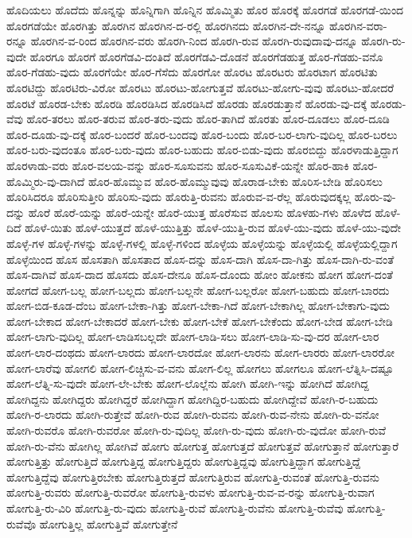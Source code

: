 {ಹೊದಿಯಲು
ಹೊದೆದು
ಹೊನ್ನನ್ನು
ಹೊನ್ನಿಗಾಗಿ
ಹೊನ್ನಿನ
ಹೊಮ್ಮಿತು
ಹೊರ
ಹೊರಕ್ಕೆ
ಹೊರಗಡೆ
ಹೊರಗಡೆ-ಯಿಂದ
ಹೊರಗಡೆಯೇ
ಹೊರಗಿತ್ತು
ಹೊರಗಿನ
ಹೊರಗಿನ-ದ-ರಲ್ಲಿ
ಹೊರಗಿನದು
ಹೊರಗಿನ-ದೇ-ನನ್ನೂ
ಹೊರಗಿನ-ವರಾ-ರನ್ನೂ
ಹೊರಗಿನ-ವ-ರಿಂದ
ಹೊರಗಿನ-ವರು
ಹೊರಗಿ-ನಿಂದ
ಹೊರಗಿ-ರುವ
ಹೊರಗಿ-ರುವುದಾವು-ದನ್ನೂ
ಹೊರಗಿ-ರು-ವುದೇ
ಹೊರಗೂ
ಹೊರಗೆ
ಹೊರಗೆಡವಿ-ದಂತಿದೆ
ಹೊರಗೆಡವಿ-ದೊಡನೆ
ಹೊರಗೆಡಹುತ್ತ
ಹೊರ-ಗೆಡಹು-ವನೊ
ಹೊರ-ಗೆಡಹು-ವುದು
ಹೊರಗೆಯೇ
ಹೊರ-ಗೆಸೆದು
ಹೊರಗೋ
ಹೊರಟ
ಹೊರಟರು
ಹೊರಟಾಗ
ಹೊರಟಿತು
ಹೊರಟಿದ್ದು
ಹೊರಟಿರು-ವಿರೋ
ಹೊರಟು
ಹೊರಟು-ಹೋಗುತ್ತವೆ
ಹೊರಟು-ಹೋಗು-ವುವು
ಹೊರಟು-ಹೋದರೆ
ಹೊರಟೆ
ಹೊರಡ-ಬೇಕು
ಹೊರಡಿ
ಹೊರಡಿಸಿದ
ಹೊರಡಿಸಿದೆ
ಹೊರಡು
ಹೊರಡುತ್ತಾನೆ
ಹೊರಡು-ವು-ದಕ್ಕೆ
ಹೊರಡು-ವೆವು
ಹೊರ-ತರಲು
ಹೊರ-ತರುವ
ಹೊರ-ತರು-ವುದು
ಹೊರ-ತಾಗಿದೆ
ಹೊರತು
ಹೊರ-ದೂಡಲು
ಹೊರ-ದೂಡಿ
ಹೊರ-ದೂಡು-ವು-ದಕ್ಕೆ
ಹೊರ-ಬಂದರೆ
ಹೊರ-ಬಂದವು
ಹೊರ-ಬಂದು
ಹೊರ-ಬರ-ಲಾಗು-ವುದಿಲ್ಲ
ಹೊರ-ಬರಲು
ಹೊರ-ಬರು-ವುದಂತೂ
ಹೊರ-ಬರು-ವುದು
ಹೊರ-ಬಹುದು
ಹೊರ-ಬಿಡು-ವುದು
ಹೊರಬಿದ್ದು
ಹೊರಳಾಡುತ್ತಿದ್ದಾಗ
ಹೊರಳಾಡು-ವರು
ಹೊರ-ವಲಯ-ವನ್ನು
ಹೊರ-ಸೂಸುವನು
ಹೊರ-ಸೂಸುವಿಕೆ-ಯನ್ನೇ
ಹೊರ-ಹಾಕಿ
ಹೊರ-ಹೊಮ್ಮಿರು-ವು-ದಾಗಿದೆ
ಹೊರ-ಹೊಮ್ಮುವ
ಹೊರ-ಹೊಮ್ಮುವುವು
ಹೊರಾಡ-ಬೇಕು
ಹೊರಿಸ-ಬೇಡಿ
ಹೊರಿಸಲು
ಹೊರಿಸಿದರೂ
ಹೊರಿಸುತ್ತೀರಿ
ಹೊರಿಸು-ವುದು
ಹೊರುತ್ತಿ-ರುವನು
ಹೊರುವ-ವ-ರೆಲ್ಲ
ಹೊರುವುದಕ್ಕಲ್ಲ
ಹೊರು-ವು-ದನ್ನು
ಹೊರೆ
ಹೊರೆ-ಯನ್ನು
ಹೊರೆ-ಯನ್ನೇ
ಹೊರೆ-ಯುತ್ತ
ಹೊರೆಸುವ
ಹೊಲಸು
ಹೊಳಹು-ಗಳು
ಹೊಳೆದ
ಹೊಳೆ-ದಿದೆ
ಹೊಳೆ-ಯಿತು
ಹೊಳೆ-ಯುತ್ತದೆ
ಹೊಳೆ-ಯುತ್ತಿತ್ತು
ಹೊಳೆ-ಯುತ್ತಿ-ರುವ
ಹೊಳೆ-ಯು-ವುದು
ಹೊಳೆ-ಯು-ವುದೇ
ಹೊಳ್ಳೆ-ಗಳ
ಹೊಳ್ಳೆ-ಗಳನ್ನು
ಹೊಳ್ಳೆ-ಗಳಲ್ಲಿ
ಹೊಳ್ಳೆ-ಗಳಿಂದ
ಹೊಳ್ಳೆಯ
ಹೊಳ್ಳೆಯನ್ನು
ಹೊಳ್ಳೆಯಲ್ಲಿ
ಹೊಳ್ಳೆಯಲ್ಲಿದ್ದಾಗ
ಹೊಳ್ಳೆಯಿಂದ
ಹೊಸ
ಹೊಸತಾಗಿ
ಹೊಸತಾದ
ಹೊಸ-ದನ್ನು
ಹೊಸ-ದಾಗಿ
ಹೊಸ-ದಾ-ಗಿತ್ತು
ಹೊಸ-ದಾಗಿ-ರು-ವಂತೆ
ಹೊಸ-ದಾಗಿವೆ
ಹೊಸ-ದಾದ
ಹೊಸದು
ಹೊಸ-ದೇನೂ
ಹೊಸ-ದೊಂದು
ಹೋಂ
ಹೋಕನು
ಹೋಗ
ಹೋಗ-ದಂತೆ
ಹೋಗದೆ
ಹೋಗ-ಬಲ್ಲ
ಹೋಗ-ಬಲ್ಲದು
ಹೋಗ-ಬಲ್ಲನೇ
ಹೋಗ-ಬಲ್ಲರೋ
ಹೋಗ-ಬಹುದು
ಹೋಗ-ಬಾರದು
ಹೋಗ-ಬಿಡ-ಕೂಡ-ದೆಂಬ
ಹೋಗ-ಬೇಕಾ-ಗಿತ್ತು
ಹೋಗ-ಬೇಕಾ-ಗಿದೆ
ಹೋಗ-ಬೇಕಾಗಿಲ್ಲ
ಹೋಗ-ಬೇಕಾಗು-ವುದು
ಹೋಗ-ಬೇಕಾದ
ಹೋಗ-ಬೇಕಾದರೆ
ಹೋಗ-ಬೇಕು
ಹೋಗ-ಬೇಕೆ
ಹೋಗ-ಬೇಕೆಂದು
ಹೋಗ-ಬೇಡ
ಹೋಗ-ಬೇಡಿ
ಹೋಗ-ಲಾಗು-ವುದಿಲ್ಲ
ಹೋಗ-ಲಾಡಿಸಬಲ್ಲದೇ
ಹೋಗ-ಲಾಡಿ-ಸಲು
ಹೋಗ-ಲಾಡಿ-ಸು-ವು-ದರ
ಹೋಗ-ಲಾರ
ಹೋಗ-ಲಾರ-ದಂಥದು
ಹೋಗ-ಲಾರದು
ಹೋಗ-ಲಾರದೋ
ಹೋಗ-ಲಾರನು
ಹೋಗ-ಲಾರರು
ಹೋಗ-ಲಾರರೋ
ಹೋಗ-ಲಾರೆವು
ಹೋಗಲಿ
ಹೋಗ-ಲಿಚ್ಚಿಸು-ವ-ವನು
ಹೋಗ-ಲಿಲ್ಲ
ಹೋಗಲು
ಹೋಗಲೂ
ಹೋಗ-ಲೆತ್ನಿಸಿ-ದಷ್ಟೂ
ಹೋಗ-ಲೆತ್ನಿ-ಸು-ವುದೇ
ಹೋಗ-ಲೇ-ಬೇಕು
ಹೋಗ-ಲೊಲ್ಲೆನು
ಹೋಗಿ
ಹೋಗಿ-ಇನ್ನು
ಹೋಗಿದೆ
ಹೋಗಿದ್ದ
ಹೋಗಿದ್ದನು
ಹೋಗಿದ್ದರು
ಹೋಗಿದ್ದರೆ
ಹೋಗಿದ್ದಾಗ
ಹೋಗಿದ್ದಿರ-ಬಹುದು
ಹೋಗಿದ್ದೇವೆ
ಹೋಗಿ-ರ-ಬಹುದು
ಹೋಗಿ-ರ-ಲಾರದು
ಹೋಗಿ-ರುತ್ತೇವೆ
ಹೋಗಿ-ರುವ
ಹೋಗಿ-ರುವನು
ಹೋಗಿ-ರುವ-ನೇನು
ಹೋಗಿ-ರು-ವನೋ
ಹೋಗಿ-ರುವರೊ
ಹೋಗಿ-ರುವರೋ
ಹೋಗಿ-ರು-ವುದಿಲ್ಲ
ಹೋಗಿ-ರು-ವುದು
ಹೋಗಿ-ರು-ವುದೋ
ಹೋಗಿ-ರುವೆ
ಹೋಗಿ-ರು-ವೆನು
ಹೋಗಿಲ್ಲ
ಹೋಗಿವೆ
ಹೋಗು
ಹೋಗುತ್ತ
ಹೋಗುತ್ತದೆ
ಹೋಗುತ್ತವೆ
ಹೋಗುತ್ತಾನೆ
ಹೋಗುತ್ತಾರೆ
ಹೋಗುತ್ತಿತ್ತು
ಹೋಗುತ್ತಿದೆ
ಹೋಗುತ್ತಿದ್ದ
ಹೋಗುತ್ತಿದ್ದರು
ಹೋಗುತ್ತಿದ್ದವು
ಹೋಗುತ್ತಿದ್ದಾಗ
ಹೋಗುತ್ತಿದ್ದೆ
ಹೋಗುತ್ತಿದ್ದೆವು
ಹೋಗುತ್ತಿರಬೇಕು
ಹೋಗುತ್ತಿರುತ್ತದೆ
ಹೋಗುತ್ತಿರುವ
ಹೋಗುತ್ತಿ-ರುವಂತೆ
ಹೋಗುತ್ತಿ-ರುವನು
ಹೋಗುತ್ತಿ-ರುವರು
ಹೋಗುತ್ತಿ-ರುವರೋ
ಹೋಗುತ್ತಿ-ರುವಳು
ಹೋಗುತ್ತಿ-ರುವ-ವ-ರನ್ನು
ಹೋಗುತ್ತಿ-ರುವಾಗ
ಹೋಗುತ್ತಿ-ರು-ವಿರಿ
ಹೋಗುತ್ತಿ-ರು-ವುದು
ಹೋಗುತ್ತಿ-ರುವೆ
ಹೋಗುತ್ತಿ-ರುವೆನು
ಹೋಗುತ್ತಿ-ರುವೆವು
ಹೋಗುತ್ತಿ-ರುವೆವೊ
ಹೋಗುತ್ತಿಲ್ಲ
ಹೋಗುತ್ತಿವೆ
ಹೋಗುತ್ತೇನೆ
}
